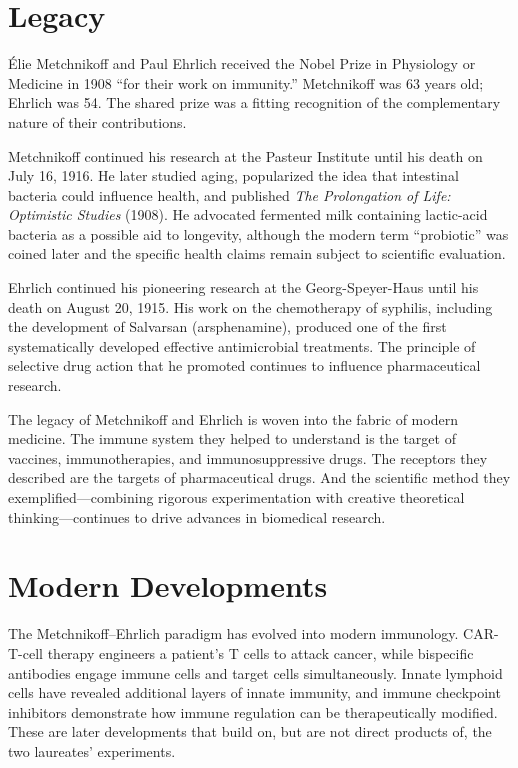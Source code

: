 \section{Legacy}

\'{E}lie Metchnikoff and Paul Ehrlich received the Nobel Prize in Physiology or Medicine in 1908 ``for their work on immunity.'' Metchnikoff was 63 years old; Ehrlich was 54. The shared prize was a fitting recognition of the complementary nature of their contributions.

Metchnikoff continued his research at the Pasteur Institute until his death on July 16, 1916. He later studied aging, popularized the idea that intestinal bacteria could influence health, and published \emph{The Prolongation of Life: Optimistic Studies} (1908). He advocated fermented milk containing lactic-acid bacteria as a possible aid to longevity, although the modern term ``probiotic'' was coined later and the specific health claims remain subject to scientific evaluation.

Ehrlich continued his pioneering research at the Georg-Speyer-Haus until his death on August 20, 1915. His work on the chemotherapy of syphilis, including the development of Salvarsan (arsphenamine), produced one of the first systematically developed effective antimicrobial treatments. The principle of selective drug action that he promoted continues to influence pharmaceutical research.

The legacy of Metchnikoff and Ehrlich is woven into the fabric of modern medicine. The immune system they helped to understand is the target of vaccines, immunotherapies, and immunosuppressive drugs. The receptors they described are the targets of pharmaceutical drugs. And the scientific method they exemplified---combining rigorous experimentation with creative theoretical thinking---continues to drive advances in biomedical research.


\section{Modern Developments}

The Metchnikoff--Ehrlich paradigm has evolved into modern immunology. CAR-T-cell therapy engineers a patient's T cells to attack cancer, while bispecific antibodies engage immune cells and target cells simultaneously. Innate lymphoid cells have revealed additional layers of innate immunity, and immune checkpoint inhibitors demonstrate how immune regulation can be therapeutically modified. These are later developments that build on, but are not direct products of, the two laureates' experiments.


